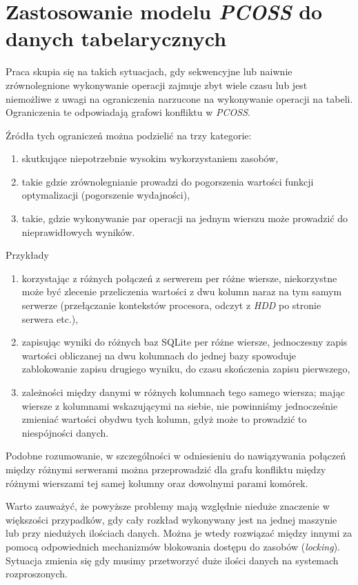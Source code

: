 \documentclass[brudnopis]{xmgr}
\begin{document}
\chapter{Zastosowanie modelu \emph{PCOSS} do danych tabelarycznych}

Praca skupia się na takich sytuacjach, gdy sekwencyjne lub naiwnie zrównolegnione wykonywanie operacji zajmuje zbyt wiele czasu lub jest niemożliwe z uwagi na ograniczenia narzucone na wykonywanie operacji na tabeli.
Ograniczenia te odpowiadają grafowi konfliktu w \emph{PCOSS}.
\medskip

Źródła tych ograniczeń można podzielić na trzy kategorie:
\begin{enumerate}
    \item skutkujące niepotrzebnie wysokim wykorzystaniem zasobów,
    \item takie gdzie zrównolegnianie prowadzi do pogorszenia wartości funkcji optymalizacji (pogorszenie wydajności),
    \item takie, gdzie wykonywanie par operacji na jednym wierszu może prowadzić do nieprawidłowych wyników.
\end{enumerate}
\medskip

Przykłady
\begin{enumerate}
    \item korzystając z różnych połączeń z serwerem per różne wiersze, niekorzystne może być zlecenie przeliczenia wartości z dwu kolumn naraz na tym samym serwerze (przełączanie kontekstów procesora, odczyt z \emph{HDD} po stronie serwera etc.),
    \item zapisując wyniki do różnych baz SQLite per różne wiersze, jednoczesny zapis wartości obliczanej na dwu kolumnach do jednej bazy spowoduje zablokowanie zapisu drugiego wyniku, do czasu skończenia zapisu pierwszego,
    \item zależności między danymi w różnych kolumnach tego samego wiersza; mając wiersze z kolumnami wskazującymi na siebie, nie powinniśmy jednocześnie zmieniać wartości obydwu tych kolumn, gdyż może to prowadzić to niespójności danych.
\end{enumerate}
\medskip

Podobne rozumowanie, w szczególności w odniesieniu do nawiązywania połączeń między różnymi serwerami można przeprowadzić dla grafu konfliktu między różnymi wierszami tej samej kolumny oraz dowolnymi parami komórek.
\medskip

Warto zauważyć, że powyższe problemy mają względnie nieduże znaczenie w większości przypadków, gdy cały rozkład wykonywany jest na jednej maszynie lub przy niedużych ilościach danych. Można je wtedy rozwiązać między innymi za pomocą odpowiednich mechanizmów blokowania dostępu do zasobów (\emph{locking}).
Sytuacja zmienia się gdy musimy przetworzyć duże ilości danych na systemach rozproszonych.
\medskip
\end{document}
